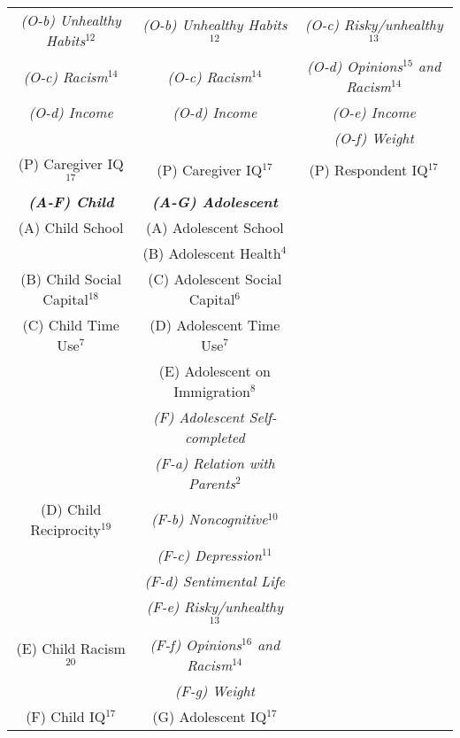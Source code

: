 \documentclass{article}
\begin{document}
\begin{table}
\begin{center}
\begin{tabular}{ c c c }
\textit{(O-b) Unhealthy Habits$^{12}$} & \textit{(O-b) Unhealthy Habits$^{12}$} & \textit{(O-c) Risky/unhealthy$^{13}$} \\
\textit{(O-c) Racism$^{14}$} & \textit{(O-c) Racism$^{14}$} & \textit{(O-d) Opinions$^{15}$ and Racism$^{14}$} \\
\textit{(O-d) Income} & \textit{(O-d) Income} & \textit{(O-e) Income} \\
 &  & \textit{(O-f) Weight} \\
(P) Caregiver IQ $^{17}$ & (P) Caregiver IQ$^{17}$ & (P) Respondent IQ$^{17}$ \\
\hline
\textbf{\textit{(A-F) Child}} & \textbf{\textit{(A-G) Adolescent}} & \\
\hline
(A) Child School & (A) Adolescent School & \\
 & (B) Adolescent Health$^{4}$ & \\
(B) Child Social Capital$^{18}$ & (C) Adolescent Social Capital$^{6}$ & \\
(C) Child Time Use$^{7}$ & (D) Adolescent Time Use$^{7}$ & \\
 & (E) Adolescent on Immigration$^{8}$ & \\
 & \textit{(F) Adolescent Self-completed} & \\
 & \textit{(F-a) Relation with Parents$^{2}$} & \\
(D) Child Reciprocity$^{19}$ & \textit{(F-b) Noncognitive$^{10}$} & \\
 & \textit{(F-c) Depression$^{11}$} & \\
 & \textit{(F-d) Sentimental Life} & \\
 & \textit{(F-e) Risky/unhealthy$^{13}$} & \\
(E) Child Racism$^{20}$ & \textit{(F-f) Opinions$^{16}$ and Racism$^{14}$} & \\
 & \textit{(F-g) Weight} & \\
(F) Child IQ$^{17}$ & (G) Adolescent IQ$^{17}$ &  \\
\hline
\end{tabular}
\end{center}

\end{table}
\end{document}
